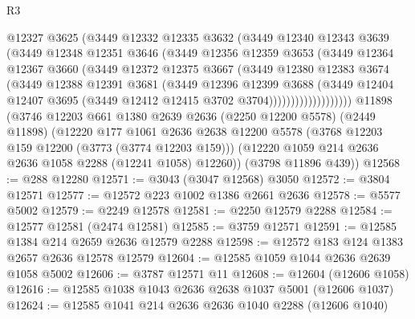 \begin{lexlean}{R3}
\begin{coremodule}
                    @12327
                    @3625
                    (@3449
                      @12332
                      @12335
                      @3632
                      (@3449
                        @12340
                        @12343
                        @3639
                        (@3449
                          @12348
                          @12351
                          @3646
                          (@3449
                            @12356
                            @12359
                            @3653
                            (@3449
                              @12364
                              @12367
                              @3660
                              (@3449
                                @12372
                                @12375
                                @3667
                                (@3449
                                  @12380
                                  @12383
                                  @3674
                                  (@3449
                                    @12388
                                    @12391
                                    @3681
                                    (@3449
                                      @12396
                                      @12399
                                      @3688
                                      (@3449
                                        @12404
                                        @12407
                                        @3695
                                        (@3449 @12412 @12415 @3702 @3704)))))))))))))))))))
    @11898
    (@3746
      @12203
      @661
      @1380
      @2639
      @2636
      (@2250 @12200 @5578)
      (@2449 @11898)
      (@12220
        @177
        @1061
        @2636
        @2638
        @12200
        @5578
        (@3768 @12203 @159 @12200 (@3773 (@3774 @12203 @159)))
        (@12220 @1059 @214 @2636 @2636 @1058 @2288 (@12241 @1058) @12260))
      (@3798 @11896 @439))
@12568 := @288 @12280
@12571 := @3043 (@3047 @12568) @3050
@12572 := @3804 @12571
@12577 := @12572 @223 @1002 @1386 @2661 @2636
@12578 := @5577 @5002
@12579 := @2249 @12578
@12581 := @2250 @12579 @2288
@12584 := @12577 @12581 (@2474 @12581)
@12585 := @3759 @12571
@12591 := @12585 @1384 @214 @2659 @2636 @12579 @2288
@12598 := @12572 @183 @124 @1383 @2657 @2636 @12578 @12579
@12604 := @12585 @1059 @1044 @2636 @2639 @1058 @5002
@12606 := @3787 @12571 @11
@12608 := @12604 (@12606 @1058)
@12616 := @12585 @1038 @1043 @2636 @2638 @1037 @5001 (@12606 @1037)
@12624 := @12585 @1041 @214 @2636 @2636 @1040 @2288 (@12606 @1040)

\end{coremodule}
\end{lexlean}
